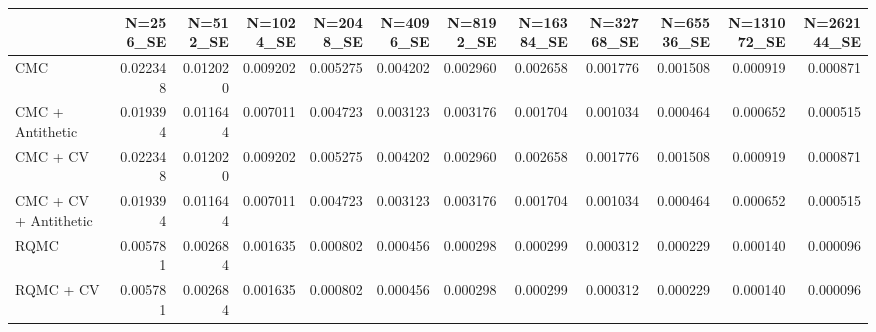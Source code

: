 \begin{tabular}{lrrrrrrrrrrr}
\toprule
 & N=256_SE & N=512_SE & N=1024_SE & N=2048_SE & N=4096_SE & N=8192_SE & N=16384_SE & N=32768_SE & N=65536_SE & N=131072_SE & N=262144_SE \\
\midrule
CMC & 0.022348 & 0.012020 & 0.009202 & 0.005275 & 0.004202 & 0.002960 & 0.002658 & 0.001776 & 0.001508 & 0.000919 & 0.000871 \\
CMC + Antithetic & 0.019394 & 0.011644 & 0.007011 & 0.004723 & 0.003123 & 0.003176 & 0.001704 & 0.001034 & 0.000464 & 0.000652 & 0.000515 \\
CMC + CV & 0.022348 & 0.012020 & 0.009202 & 0.005275 & 0.004202 & 0.002960 & 0.002658 & 0.001776 & 0.001508 & 0.000919 & 0.000871 \\
CMC + CV + Antithetic & 0.019394 & 0.011644 & 0.007011 & 0.004723 & 0.003123 & 0.003176 & 0.001704 & 0.001034 & 0.000464 & 0.000652 & 0.000515 \\
RQMC & 0.005781 & 0.002684 & 0.001635 & 0.000802 & 0.000456 & 0.000298 & 0.000299 & 0.000312 & 0.000229 & 0.000140 & 0.000096 \\
RQMC + CV & 0.005781 & 0.002684 & 0.001635 & 0.000802 & 0.000456 & 0.000298 & 0.000299 & 0.000312 & 0.000229 & 0.000140 & 0.000096 \\
\bottomrule
\end{tabular}
